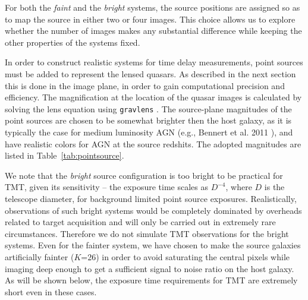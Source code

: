 \documentclass[a4paper,11pt]{article}
\begin{document}
For both the \textit{faint} and the \textit{bright} systems, the source positions are
assigned so as to map the source in either two or four images. This
choice allows us to explore whether the number of images makes any
substantial difference while keeping the other properties of the
systems fixed.

In order to construct realistic systems for time delay measurements,
point sources must be added to represent the lensed quasars. As
described in the next section this is done in the image plane, in
order to gain computational precision and efficiency. The
magnification at the location of the quasar images is calculated by
solving the lens equation using \texttt{gravlens}
\cite{2011ascl.soft02003K}. The source-plane magnitudes of the point
sources are chosen to be somewhat brighter then the host galaxy, as it
is typically the case for medium luminosity AGN
(e.g., Bennert et al. 2011 \cite{2011ApJ...726...59B}), and have realistic colors for AGN at the
source redshits. The adopted magnitudes are listed in
Table~\ref{tab:pointsource}.

We note that the \textit{bright} source configuration is too bright to
be practical for TMT, given its sensitivity -- the exposure time
scales as $D^{-4}$, where $D$ is the telescope diameter, for
background limited point source exposures. Realistically, observations
of such bright systems would be completely dominated by overheads
related to target acquisition and will only be carried out in
extremely rare circumstances. Therefore we do not simulate TMT
observations for the bright systems. Even for the fainter system, we
have chosen to make the source galaxies artificially fainter ($K$=26)
in order to avoid saturating the central pixels while imaging deep
enough to get a sufficient signal to noise ratio on the host
galaxy. As will be shown below, the exposure time requirements for TMT
are extremely short even in these cases.
\end{document}
